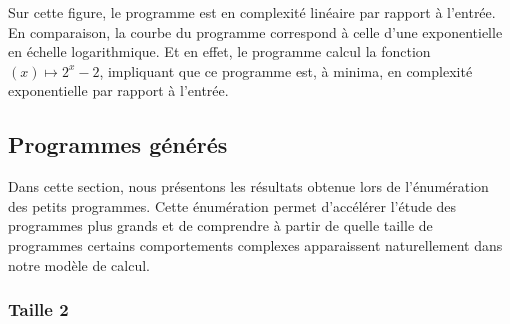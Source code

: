 \documentclass[a4paper, 11pt]{article}
\begin{document}
Sur cette figure, le programme  est en complexité linéaire par rapport à l'entrée.
En comparaison, la courbe du programme  correspond à celle d'une exponentielle
 en échelle logarithmique. Et en effet, le programme  calcul la fonction
$(x) \mapsto 2^x - 2$, impliquant que ce programme est, à minima, en complexité exponentielle par rapport
à l'entrée.

\subsection{Programmes générés \label{programmes generes}}

Dans cette section, nous présentons les résultats obtenue lors de l'énumération des petits programmes.
Cette énumération permet  d’accélérer l’étude des programmes plus grands et de comprendre à partir 
de quelle taille de programmes certains comportements complexes apparaissent naturellement dans notre modèle de
calcul.

\subsubsection{Taille 2}
\end{document}
